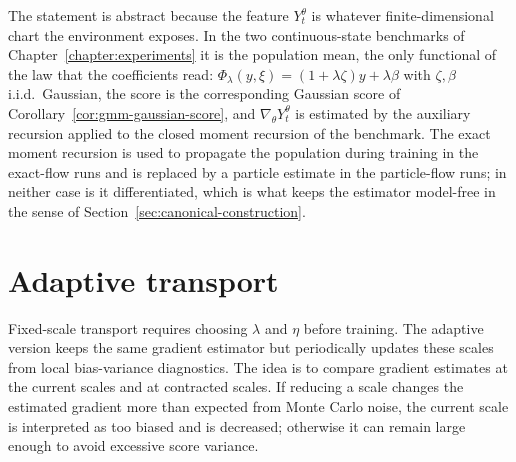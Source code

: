 The statement is abstract because the feature $Y_t^\theta$ is whatever finite-dimensional chart the environment exposes. In the two continuous-state benchmarks of Chapter~\ref{chapter:experiments} it is the population mean, the only functional of the law that the coefficients read: $\Phi_\lambda(y,\xi)=(1+\lambda\zeta)y+\lambda\beta$ with $\zeta,\beta$ i.i.d.\ Gaussian, the score is the corresponding Gaussian score of Corollary~\ref{cor:gmm-gaussian-score}, and $\nabla_\theta Y_t^\theta$ is estimated by the auxiliary recursion applied to the closed moment recursion of the benchmark. The exact moment recursion is used to propagate the population during training in the exact-flow runs and is replaced by a particle estimate in the particle-flow runs; in neither case is it differentiated, which is what keeps the estimator model-free in the sense of Section~\ref{sec:canonical-construction}.

\section{Adaptive transport}
\label{sec:adaptive-transport}

Fixed-scale transport requires choosing $\lambda$ and $\eta$ before training. The adaptive version keeps the same gradient estimator but periodically updates these scales from local bias-variance diagnostics. The idea is to compare gradient estimates at the current scales and at contracted scales. If reducing a scale changes the estimated gradient more than expected from Monte Carlo noise, the current scale is interpreted as too biased and is decreased; otherwise it can remain large enough to avoid excessive score variance.


